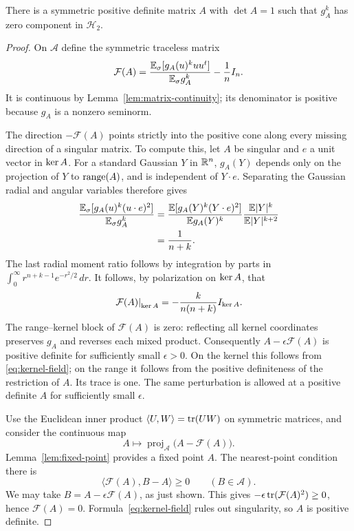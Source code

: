 \begin{proposition}\label{prop:position}
There is a symmetric positive definite matrix $A$ with $\det A=1$
such that $g_A^k$ has zero component in $\mathcal H_2$.
\end{proposition}

\begin{proof}
On $\mathcal A$ define the symmetric traceless matrix
\begin{equation}\label{eq:position-field}
 \mathcal F(A)
 =\frac{\mathbb E_{\sigma}[g_A(u)^k uu^t]}{\mathbb E_{\sigma} g_A^k}-\frac1nI_n.
\end{equation}
It is continuous by Lemma~\ref{lem:matrix-continuity}; its
denominator is positive because $g_A$ is a nonzero seminorm.

The direction $-\mathcal F(A)$ points strictly into the positive
cone along every missing direction of a singular matrix. To compute this, let
$A$ be singular and $e$ a unit vector in $\operatorname{ker} A$. For a standard
Gaussian $Y$ in $\mathbb R^n$, $g_A(Y)$ depends only on the projection
of $Y$ to $\operatorname{range}(A)$, and is independent of $Y\cdot e$.
Separating the Gaussian radial and angular variables therefore gives
\begin{align*}
 \frac{\mathbb E_{\sigma}[g_A(u)^k(u\cdot e)^2]}{\mathbb E_{\sigma} g_A^k}
 &=\frac{\mathbb E[g_A(Y)^k(Y\cdot e)^2]}
          {\mathbb E g_A(Y)^k}
   \frac{\mathbb E|Y|^k}{\mathbb E|Y|^{k+2}}\\
 &=\frac{1}{n+k}.
\end{align*}
The last radial moment ratio follows by integration by parts in
$\int_0^\infty r^{n+k-1}e^{-r^2/2}\,dr$.
It follows, by polarization on $\operatorname{ker} A$, that
\begin{equation}\label{eq:kernel-field}
 \left.\mathcal F(A)\right|_{\operatorname{ker} A}
 =-\frac{k}{n(n+k)}I_{\operatorname{ker} A}.
\end{equation}
The range--kernel block of $\mathcal F(A)$ is zero: reflecting
all kernel coordinates preserves $g_A$ and reverses each mixed
product. Consequently $A-\epsilon\mathcal F(A)$ is positive
definite for sufficiently small $\epsilon>0$. On the kernel this
follows from \eqref{eq:kernel-field}; on the range it follows from
the positive definiteness of the restriction of $A$. Its trace is
one. The same perturbation is allowed at a positive definite $A$
for sufficiently small $\epsilon$.

Use the Euclidean inner product $\langle U,W\rangle=\operatorname{tr}(UW)$ on
symmetric matrices, and consider the continuous map
\[
 A\longmapsto
 \operatorname{proj}_{\mathcal A}\bigl(A-\mathcal F(A)\bigr).
\]
Lemma~\ref{lem:fixed-point} provides a fixed point $A$. The
nearest-point condition there is
\[
 \langle\mathcal F(A),B-A\rangle\ge0
 \qquad(B\in\mathcal A).
\]
We may take $B=A-\epsilon\mathcal F(A)$, as just shown. This
gives $-\epsilon\operatorname{tr}(\mathcal F(A)^2)\ge0$, hence
$\mathcal F(A)=0$. Formula~\eqref{eq:kernel-field} rules out
singularity, so $A$ is positive definite.


\end{proof}
